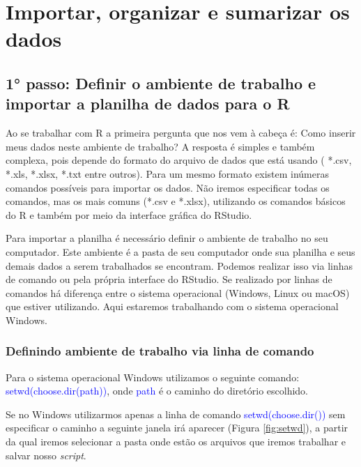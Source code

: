 \documentclass[14pt,titlepage, oneside, openany, a4paper]{book}
\begin{document}
\hypertarget{importar-organizar-e-sumarizar-os-dados}{%
\chapter{Importar, organizar e sumarizar os dados}\label{importar-organizar-e-sumarizar-os-dados}}

\hypertarget{passo-definir-o-ambiente-de-trabalho-e-importar-a-planilha-de-dados-para-o-r}{%
\section{1° passo: Definir o ambiente de trabalho e importar a planilha de dados para o R}\label{passo-definir-o-ambiente-de-trabalho-e-importar-a-planilha-de-dados-para-o-r}}

Ao se trabalhar com R a primeira pergunta que nos vem à cabeça é: Como inserir meus dados neste ambiente de trabalho? A resposta é simples e também complexa, pois depende do formato do arquivo de dados que está usando ( *.csv, *.xls, *.xlsx, *.txt entre outros). Para um mesmo formato existem inúmeras comandos possíveis para importar os dados. Não iremos especificar todas os comandos, mas os mais comuns (*.csv e *.xlsx), utilizando os comandos básicos do R e também por meio da interface gráfica do RStudio.

Para importar a planilha é necessário definir o ambiente de trabalho no seu computador. Este ambiente é a pasta de seu computador onde sua planilha e seus demais dados a serem trabalhados se encontram. Podemos realizar isso via linhas de comando ou pela própria interface do RStudio. Se realizado por linhas de comandos há diferença entre o sistema operacional (Windows, Linux ou macOS) que estiver utilizando. Aqui estaremos trabalhando com o sistema operacional Windows.

\hypertarget{definindo-ambiente-de-trabalho-via-linha-de-comando}{%
\subsection{Definindo ambiente de trabalho via linha de comando}\label{definindo-ambiente-de-trabalho-via-linha-de-comando}}

Para o sistema operacional Windows utilizamos o seguinte comando: \textcolor{blue}{setwd(choose.dir(path))}, onde \textcolor{blue}{path} é o caminho do diretório escolhido.

Se no Windows utilizarmos apenas a linha de comando \textcolor{blue}{setwd(choose.dir())} sem especificar o caminho a seguinte janela irá aparecer (Figura \ref{fig:setwd}), a partir da qual iremos selecionar a pasta onde estão os arquivos que iremos trabalhar e salvar nosso \emph{script}.
\end{document}

